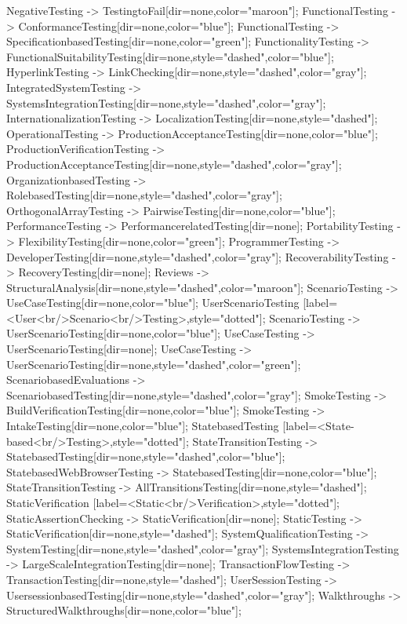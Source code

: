 \documentclass{article}
\begin{document}
{NegativeTesting -> TestingtoFail[dir=none,color="maroon"];
FunctionalTesting -> ConformanceTesting[dir=none,color="blue"];
FunctionalTesting -> SpecificationbasedTesting[dir=none,color="green"];
FunctionalityTesting -> FunctionalSuitabilityTesting[dir=none,style="dashed",color="blue"];
HyperlinkTesting -> LinkChecking[dir=none,style="dashed",color="gray"];
IntegratedSystemTesting -> SystemsIntegrationTesting[dir=none,style="dashed",color="gray"];
InternationalizationTesting -> LocalizationTesting[dir=none,style="dashed"];
OperationalTesting -> ProductionAcceptanceTesting[dir=none,color="blue"];
ProductionVerificationTesting -> ProductionAcceptanceTesting[dir=none,style="dashed",color="gray"];
OrganizationbasedTesting -> RolebasedTesting[dir=none,style="dashed",color="gray"];
OrthogonalArrayTesting -> PairwiseTesting[dir=none,color="blue"];
PerformanceTesting -> PerformancerelatedTesting[dir=none];
PortabilityTesting -> FlexibilityTesting[dir=none,color="green"];
ProgrammerTesting -> DeveloperTesting[dir=none,style="dashed",color="gray"];
RecoverabilityTesting -> RecoveryTesting[dir=none];
Reviews -> StructuralAnalysis[dir=none,style="dashed",color="maroon"];
ScenarioTesting -> UseCaseTesting[dir=none,color="blue"];
UserScenarioTesting [label=<User<br/>Scenario<br/>Testing>,style="dotted"];
ScenarioTesting -> UserScenarioTesting[dir=none,color="blue"];
UseCaseTesting -> UserScenarioTesting[dir=none];
UseCaseTesting -> UserScenarioTesting[dir=none,style="dashed",color="green"];
ScenariobasedEvaluations -> ScenariobasedTesting[dir=none,style="dashed",color="gray"];
SmokeTesting -> BuildVerificationTesting[dir=none,color="blue"];
SmokeTesting -> IntakeTesting[dir=none,color="blue"];
StatebasedTesting [label=<State-based<br/>Testing>,style="dotted"];
StateTransitionTesting -> StatebasedTesting[dir=none,style="dashed",color="blue"];
StatebasedWebBrowserTesting -> StatebasedTesting[dir=none,color="blue"];
StateTransitionTesting -> AllTransitionsTesting[dir=none,style="dashed"];
StaticVerification [label=<Static<br/>Verification>,style="dotted"];
StaticAssertionChecking -> StaticVerification[dir=none];
StaticTesting -> StaticVerification[dir=none,style="dashed"];
SystemQualificationTesting -> SystemTesting[dir=none,style="dashed",color="gray"];
SystemsIntegrationTesting -> LargeScaleIntegrationTesting[dir=none];
TransactionFlowTesting -> TransactionTesting[dir=none,style="dashed"];
UserSessionTesting -> UsersessionbasedTesting[dir=none,style="dashed",color="gray"];
Walkthroughs -> StructuredWalkthroughs[dir=none,color="blue"];

}
\end{document}
